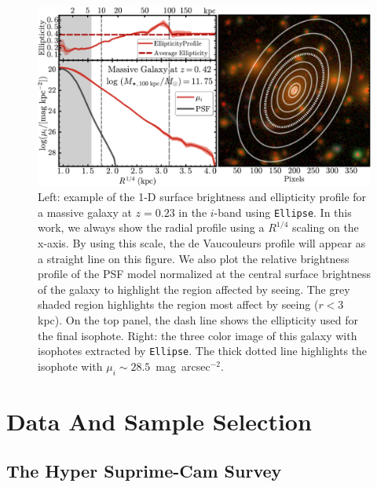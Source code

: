 \documentclass[a4paper,fleqn,usenatbib]{mnras}
\def\sb{mag~arcsec$^{-2}$}
\begin{document}
    \begin{figure}
        \centering 
        \includegraphics[width=\textwidth]{fig/redbcg_ellipse_example}
        \caption{
            Left: example of the 1-D surface brightness and ellipticity profile 
            for a massive galaxy at $z=0.23$ in the $i$-band using \texttt{Ellipse}. 
            In this work, we always show the radial profile using a $R^{1/4}$ scaling 
            on the x-axis. 
            By using this scale, the de Vaucouleurs profile will appear as a straight 
            line on this figure. 
            We also plot the relative brightness profile of the PSF model normalized 
            at the central surface brightness of the galaxy to highlight the region 
            affected by seeing. 
            The grey shaded region highlights the region most affect by seeing 
            ($r<3$ kpc).
            On the top panel, the dash line shows the ellipticity used for the final 
            isophote. 
            Right: the three color image of this galaxy with isophotes 
            extracted by \texttt{Ellipse}. 
            The thick dotted line highlights the isophote with 
            $\mu_{i}{\sim} 28.5$~\sb.
            }
        \label{fig:ellipse}
    \end{figure}

\section{Data And Sample Selection}
    \label{sec:data}

\subsection{The Hyper Suprime-Cam Survey}
    \label{ssec:hsc}
\end{document}
